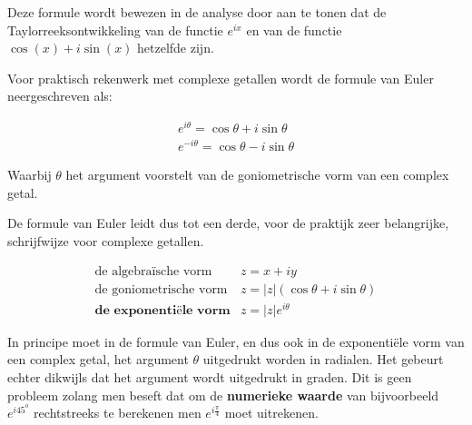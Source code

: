 Deze formule wordt bewezen in de analyse door aan te tonen dat de Taylorreeksontwikkeling van de functie $e^{ix}$ en van de functie $\cos(x) + i \sin(x)$ hetzelfde zijn. \\

\begin{eigenschap}
	Voor praktisch rekenwerk met complexe getallen wordt de formule van Euler neergeschreven als:\\

\begin{framed}
	\[  \begin{array}{l} 
	e^{i \theta}=\cos \theta +i \sin \theta \\
	e^{-i \theta}=\cos \theta - i \sin \theta 
	\end{array}  \]
\end{framed}
Waarbij $\theta$ het argument voorstelt van de goniometrische vorm van een complex getal. \\
\end{eigenschap}

\begin{eigenschap}
	De formule van Euler leidt dus tot een derde, voor de praktijk zeer belangrijke, schrijfwijze voor complexe getallen.\\

\begin{framed}
	\[ \begin{array}{ll}
	\text{de algebra\"{i}sche vorm} & z=x+iy \\
	\text{de goniometrische vorm} & z=|z|(\cos \theta +i \sin \theta) \\
	\textbf{de exponenti\"{e}le vorm} & z=|z|e^{i \theta} \end{array}  \]
\end{framed}

\end{eigenschap}

In principe moet in de formule van Euler, en dus ook in de exponenti\"{e}le vorm van een complex getal, het argument $\theta$ uitgedrukt worden in radialen. Het gebeurt echter dikwijls dat het argument wordt uitgedrukt in graden. Dit is geen probleem zolang men beseft dat om de {\bf numerieke waarde} van bijvoorbeeld $e^{i 45^{o}}$ rechtstreeks te berekenen men $e^{i\frac{\pi}{4}}$ moet uitrekenen.\\
	

